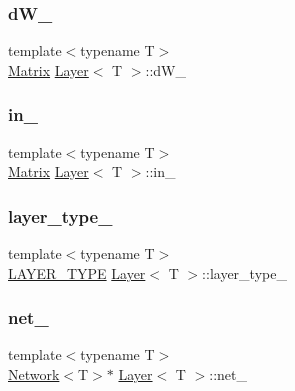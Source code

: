 \subsubsection{\texorpdfstring{dW\_}{dW\_}}
{\footnotesize\ttfamily template$<$typename T$>$ \\
\mbox{\hyperlink{class_layer_a22b1e7286096aa62bd245536c8ebdaf1}{Matrix}} \mbox{\hyperlink{class_layer}{Layer}}$<$ T $>$\+::d\+W\+\_\+\hspace{0.3cm}{\ttfamily [protected]}}

\mbox{\label{class_layer_a9482c992e218f5da65c4345be1dd7447}} 
\subsubsection{\texorpdfstring{in\_}{in\_}}
{\footnotesize\ttfamily template$<$typename T$>$ \\
\mbox{\hyperlink{class_layer_a22b1e7286096aa62bd245536c8ebdaf1}{Matrix}} \mbox{\hyperlink{class_layer}{Layer}}$<$ T $>$\+::in\+\_\+\hspace{0.3cm}{\ttfamily [protected]}}

\mbox{\label{class_layer_af60ad69b5833427d6a6a4d49db902d76}} 
\subsubsection{\texorpdfstring{layer\_type\_}{layer\_type\_}}
{\footnotesize\ttfamily template$<$typename T$>$ \\
\mbox{\hyperlink{layer__base_8hpp_a5f7e99058765b058df158c099200b154}{L\+A\+Y\+E\+R\+\_\+\+T\+Y\+PE}} \mbox{\hyperlink{class_layer}{Layer}}$<$ T $>$\+::layer\+\_\+type\+\_\+\hspace{0.3cm}{\ttfamily [protected]}}

\mbox{\label{class_layer_a5c55f43a191e4fed38002316ca71b4ff}} 
\subsubsection{\texorpdfstring{net\_}{net\_}}
{\footnotesize\ttfamily template$<$typename T$>$ \\
\mbox{\hyperlink{class_network}{Network}}$<$T$>$$\ast$ \mbox{\hyperlink{class_layer}{Layer}}$<$ T $>$\+::net\+\_\+\hspace{0.3cm}{\ttfamily [protected]}}

